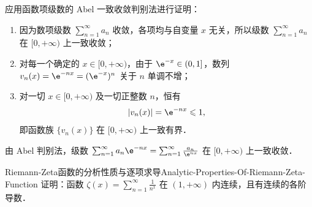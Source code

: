 \begin{myproof}
    应用函数项级数的 Abel 一致收敛判别法进行证明：
    \begin{enumerate}
        \item 因为数项级数 $\sum_{n=1}^\infty a_n$ 收敛，各项均与自变量 $x$ 无关，所以级数 $\sum_{n=1}^\infty a_n$ 在 $[0, +\infty)$ 上一致收敛；
        \item 对每一个确定的 $x \in [0, +\infty)$，由于 $\e^{-x} \in (0, 1]$，数列 $v_n(x) = \e^{-nx} = (\e^{-x})^n$ 关于 $n$ 单调不增；
        \item 对一切 $x \in [0, +\infty)$ 及一切正整数 $n$，恒有
              \begin{equation}
                  |v_n(x)| = \e^{-nx} \leqslant 1,
              \end{equation}
              即函数族 $\{v_n(x)\}$ 在 $[0, +\infty)$ 上一致有界．
    \end{enumerate}
    由 Abel 判别法，级数 $\sum_{n=1}^\infty a_n \e^{-nx} = \sum_{n=1}^\infty \frac{a_n}{\e^{nx}}$ 在 $[0, +\infty)$ 上一致收敛．
\end{myproof}

\begin{problem}{Riemann-Zeta函数的分析性质与逐项求导}{Analytic-Properties-Of-Riemann-Zeta-Function}
    证明：函数 $\zeta(x) = \sum_{n=1}^\infty \frac{1}{n^x}$ 在 $(1, +\infty)$ 内连续，且有连续的各阶导数．
\end{problem}

